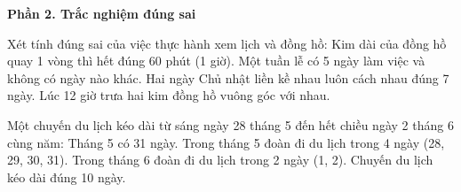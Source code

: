 \textbf{Phần 2. Trắc nghiệm đúng sai}

\begin{ex} %
Xét tính đúng sai của việc thực hành xem lịch và đồng hồ:
\choiceTF
{\True Kim dài của đồng hồ quay 1 vòng thì hết đúng 60 phút (1 giờ).}
{Một tuần lễ có 5 ngày làm việc và không có ngày nào khác.}
{\True Hai ngày Chủ nhật liền kề nhau luôn cách nhau đúng 7 ngày.}
{Lúc 12 giờ trưa hai kim đồng hồ vuông góc với nhau.}
\end{ex}

\begin{ex} %
Một chuyến du lịch kéo dài từ sáng ngày 28 tháng 5 đến hết chiều ngày 2 tháng 6 cùng năm:
\choiceTF
{\True Tháng 5 có 31 ngày.}
{\True Trong tháng 5 đoàn đi du lịch trong 4 ngày (28, 29, 30, 31).}
{\True Trong tháng 6 đoàn đi du lịch trong 2 ngày (1, 2).}
{Chuyến du lịch kéo dài đúng 10 ngày.}
\end{ex}


